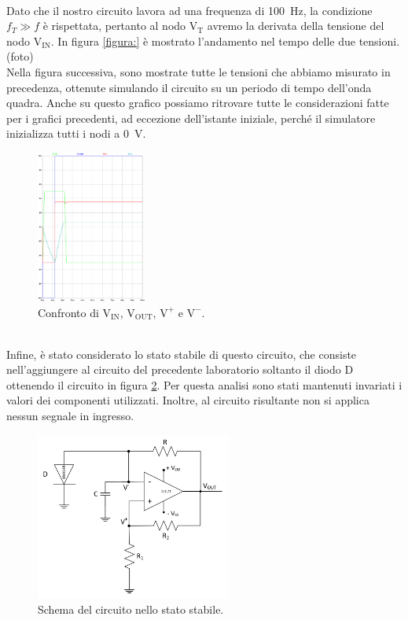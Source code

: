 \documentclass{report}
\begin{document}
\\[4pt]Dato che il nostro circuito lavora ad una frequenza di \SI{100}{\hertz}, la condizione $f_T\gg f$ è rispettata, pertanto al nodo $\mathrm{V_T}$ avremo la derivata della tensione del nodo $\mathrm{V_{IN}}$. In figura \ref{figura:} è mostrato l'andamento nel tempo delle due tensioni.
\\(foto)
\\Nella figura successiva, sono mostrate tutte le tensioni che abbiamo misurato in precedenza, ottenute simulando il circuito su un periodo di tempo dell'onda quadra. Anche su questo grafico possiamo ritrovare tutte le considerazioni fatte per i grafici precedenti, ad eccezione dell'istante iniziale, perché il simulatore inizializza tutti i nodi a \SI{0}{\volt}. 
\begin{figure}[h!]
	\centering
	\includegraphics[height=5cm]{immagini/plot_sim} %
	\caption{Confronto di $\mathrm{V_{IN}}$, $\mathrm{V_{OUT}}$, $\mathrm{V^+}$ e $\mathrm{V^-}$.}
	\label{figura:simulazione}
\end{figure}
\\Infine, è stato considerato lo stato stabile di questo circuito, che consiste nell'aggiungere al circuito del precedente laboratorio soltanto il diodo D ottenendo il circuito in figura \ref{figura:schema1stabile}. Per questa analisi sono stati mantenuti invariati i valori dei componenti utilizzati. Inoltre, al circuito risultante non si applica nessun segnale in ingresso.
\begin{figure}[h!]
	\centering
	\includegraphics[height=5.5cm]{immagini/schema1stabile}
	\caption{Schema del circuito nello stato stabile.}
	\label{figura:schema1stabile}
\end{figure}
\end{document}
